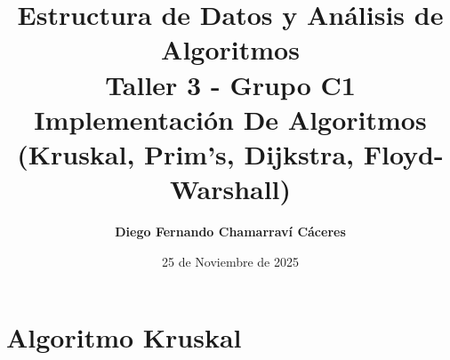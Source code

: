 \documentclass[spanish,notitlepage,letterpaper,12pt]{article}
\begin{document}
\title{\textbf{Estructura de Datos y Análisis de Algoritmos \\ Taller 3 - Grupo C1} \\
Implementación De Algoritmos (Kruskal, Prim's, Dijkstra, Floyd-Warshall) }
\author{\textbf{Diego Fernando Chamarraví Cáceres}}
\date{25 de Noviembre de 2025}

\maketitle

\tableofcontents

\newpage
\noindent
\section{Algoritmo Kruskal}
\vspace*{-0.75 cm}
\end{document}
